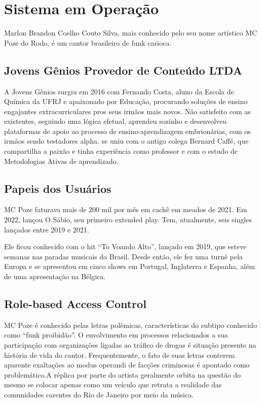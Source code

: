 \chapter{Sistema em Operação}
\label{chap5}

Marlon Brandon Coelho Couto Silva, mais conhecido pelo seu nome artístico MC Poze do Rodo, é um cantor brasileiro de funk carioca.

\section{Jovens Gênios Provedor de Conteúdo LTDA}

A Jovens Gênios surgiu em 2016 com Fernando Costa, aluno da Escola de Química da UFRJ e apaixonado por Educação, procurando soluções de ensino engajantes extracurriculares pros seus irmãos mais novos. Não satisfeito com as existentes, seguindo uma lógica efetual, aprendeu sozinho e desenvolveu plataformas de apoio ao processo de ensino-aprendizagem embrionárias, com os irmãos sendo testadores alpha.
se uniu com o antigo colega Bernard Caffé, que compartilha a paixão e tinha experiência como professor e com o estudo de Metodologias Ativas de aprendizado.
\section{Papeis dos Usuários}

MC Poze faturava mais de 200 mil por mês em cachê em meados de 2021. Em 2022, lançou O Sábio, seu primeiro extended play. Tem, atualmente, seis singles lançados entre 2019 e 2021.

Ele ficou conhecido com o hit ``To Voando Alto'', lançado em 2019, que esteve semanas nas paradas musicais do Brasil. Desde então, ele fez uma turnê pela Europa e se apresentou em cinco shows em Portugal, Inglaterra e Espanha, além de uma apresentação na Bélgica.

\section{Role-based Access Control}

MC Poze é conhecido pelas letras polêmicas, características do subtipo conhecido como ``funk proibidão''. O envolvimento em processos relacionados a sua participação com organizações ligadas ao tráfico de drogas é situação presente na história de vida do cantor. Frequentemente, o fato de suas letras conterem aparente exaltações ao modus operandi de facções criminosas é apontado como problemático.A réplica por parte do artista geralmente orbita na questão do mesmo se colocar apenas como um veículo que retrata a realidade das comunidades carentes do Rio de Janeiro por meio da música.
